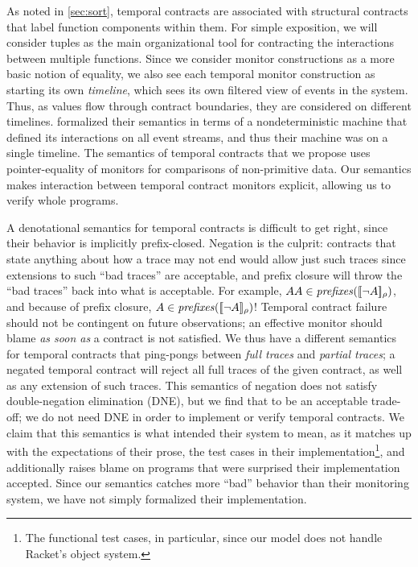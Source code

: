 %
As noted in \autoref{sec:sort}, temporal contracts are associated with structural contracts that label function components within them.
%
For simple exposition, we will consider tuples as the main organizational tool for contracting the interactions between multiple functions.
%
Since we consider monitor constructions as a more basic notion of equality, we also see each temporal monitor construction as starting its own \emph{timeline}, which sees its own filtered view of events in the system.
%
Thus, as values flow through contract boundaries, they are considered on different timelines.
%
\dfm formalized their semantics in terms of a nondeterministic machine that defined its interactions on all event streams, and thus their machine was on a single timeline.
%
The semantics of temporal contracts that we propose uses pointer-equality of monitors for comparisons of non-primitive data.
%
Our semantics makes interaction between temporal contract monitors explicit, allowing us to verify whole programs.

A denotational semantics for temporal contracts is difficult to get right, since their behavior is implicitly prefix-closed.
%
Negation is the culprit: contracts that state anything about how a trace may not end would allow just such traces since extensions to such ``bad traces'' are acceptable, and prefix closure will throw the ``bad traces'' back into what is acceptable.
%
%
For example, $AA \in \mathit{prefixes}([\![ \neg A ]\!]_{\rho})$, and because of prefix closure, $A \in \mathit{prefixes}([\![ \neg A ]\!]_{\rho})$!
%
Temporal contract failure should not be contingent on future observations; an effective monitor should blame \emph{as soon as} a contract is not satisfied.
%
We thus have a different semantics for temporal contracts that ping-pongs between \emph{full traces} and \emph{partial traces}; a negated temporal contract will reject all full traces of the given contract, as well as any extension of such traces.
%
This semantics of negation does not satisfy double-negation elimination (DNE), but we find that to be an acceptable trade-off; we do not need DNE in order to implement or verify temporal contracts.
%
We claim that this semantics is what \dfm intended their system to mean, as it matches up with the expectations of their prose, the test cases in their implementation\footnote{The functional test cases, in particular, since our model does not handle Racket's object system.}, and additionally raises blame on programs that \dfm were surprised their implementation accepted.
%
Since our semantics catches more ``bad'' behavior than their monitoring system, we have not simply formalized their implementation.

